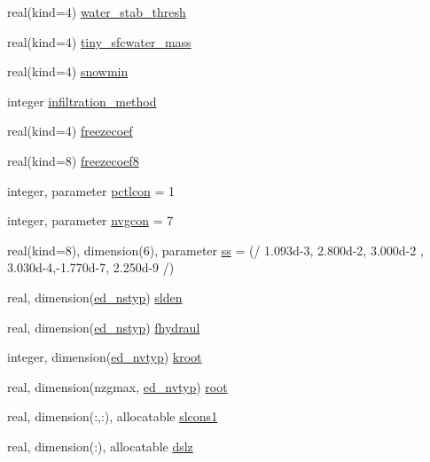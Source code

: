 \begin{DoxyCompactItemize}
\item 
real(kind=4) \hyperlink{namespacesoil__coms_ab3465a7eaa76b6f27830280b15c20d68}{water\+\_\+stab\+\_\+thresh}
\item 
real(kind=4) \hyperlink{namespacesoil__coms_a15a18b26140182f9af4a448864b04663}{tiny\+\_\+sfcwater\+\_\+mass}
\item 
real(kind=4) \hyperlink{namespacesoil__coms_adad6557f24a788e2cc72fabaa3baa968}{snowmin}
\item 
integer \hyperlink{namespacesoil__coms_a2e92f050d04249187d11251e58727a56}{infiltration\+\_\+method}
\item 
real(kind=4) \hyperlink{namespacesoil__coms_ad286e8223fbc4a8830c8f87bdbe2b459}{freezecoef}
\item 
real(kind=8) \hyperlink{namespacesoil__coms_a091312b8a88f238d1f6b75ade71f41d2}{freezecoef8}
\item 
integer, parameter \hyperlink{namespacesoil__coms_af53befc38b94519f45c1037eefe15e1c}{pctlcon} = 1
\item 
integer, parameter \hyperlink{namespacesoil__coms_aae84e5a9fa25d15c1b11e7e3e9c8c35d}{nvgcon} = 7
\item 
real(kind=8), dimension(6), parameter \hyperlink{namespacesoil__coms_a39d9ab50ccb8cb1642f28ba113c2719e}{ss} = (/ 1.\+093d-\/3, 2.\+800d-\/2, 3.\+000d-\/2 , 3.\+030d-\/4,-\/1.\+770d-\/7, 2.\+250d-\/9 /)
\item 
real, dimension(\hyperlink{namespacesoil__coms_a354035bf03f4bb65c1636100aa6737e8}{ed\+\_\+nstyp}) \hyperlink{namespacesoil__coms_ab18d5a835f6246621b56d3023dd721da}{slden}
\item 
real, dimension(\hyperlink{namespacesoil__coms_a354035bf03f4bb65c1636100aa6737e8}{ed\+\_\+nstyp}) \hyperlink{namespacesoil__coms_a89f3eedbb5e476acda53f258a75756c6}{fhydraul}
\item 
integer, dimension(\hyperlink{namespacesoil__coms_a8cb5da734a6673c4b75b841d0b4221aa}{ed\+\_\+nvtyp}) \hyperlink{namespacesoil__coms_aeec7623ed3fca9e7fce1f7f599a2b1b1}{kroot}
\item 
real, dimension(nzgmax, \hyperlink{namespacesoil__coms_a8cb5da734a6673c4b75b841d0b4221aa}{ed\+\_\+nvtyp}) \hyperlink{namespacesoil__coms_a22f6f63238ed3e10355d0dcc258d2441}{root}
\item 
real, dimension(\+:,\+:), allocatable \hyperlink{namespacesoil__coms_a0550c5c548dbfde659a2d622a91b26f5}{slcons1}
\item 
real, dimension(\+:), allocatable \hyperlink{namespacesoil__coms_a5e8ee111d9295bf4b74579a88285b613}{dslz}

\end{DoxyCompactItemize}
